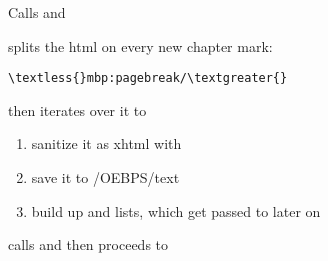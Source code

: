 \documentclass[letterpaper,10pt,english]{sphinxmanual}
\begin{document}
\begin{fulllineitems}
\label{epub:mobi2epub::mobi2epub__mobi::mobireaderCR.b.b}
\end{fulllineitems}


\begin{fulllineitems}
\label{epub:mobi2epub::save_to_directoryC}
Calls {\hyperref[epub:mobi2epub::directory_structureC]{}} and {\hyperref[mobireader:mobireader::get_htmlC]{}}

splits the html on every new chapter mark:

\begin{Verbatim}[commandchars=\\\{\}]
\textless{}mbp:pagebreak/\textgreater{}
\end{Verbatim}

then iterates over it to
\begin{enumerate}
\item {} 
sanitize it as xhtml with {\hyperref[tidyhtml:epub::html::tidyhtml]{}}

\item {} 
save it to {\hyperref[epub:path_tmp__boost::filesystem::path]{}} /OEBPS/text

\item {} 
build up {\hyperref[epub:itemid__ss]{}} and {\hyperref[epub:itemref__ss]{}} lists, which get passed to {\hyperref[epub:mobi2epub::gen_content_opf__std::stringstreamR.std::stringstreamRC]{}} later on

\end{enumerate}

\end{fulllineitems}


\begin{fulllineitems}
\label{epub:mobi2epub::save_to_directory__ss}
calls {\hyperref[epub:mobi2epub::set_out__ssR]{}} and
then proceeds to {\hyperref[epub:mobi2epub::save_to_directoryC]{}}

\end{fulllineitems}
\end{document}
